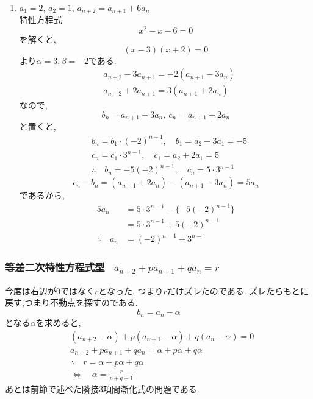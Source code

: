 \begin{enumerate}[label=(\arabic*),parsep=3pt]
\begin{align*}
          &\therefore \quad c_n=\frac12+(n-1)\cdot\frac12=\frac n2\\
          &\therefore \quad a_n=2^n\cdot c_n=n\cdot2^{n-1}
        \end{align*}
  \item $\displaystyle a_1=2,\,a_2=1,\, a_{n+2}=a_{n+1}+6a_n$\\
        特性方程式
        \[
          x^2-x-6=0
        \]
        を解くと,
        \[
          (x-3)(x+2)=0
        \]
        より$\alpha=3,\beta=-2$である.
        \begin{align*}
          &a_{n+2}-3a_{n+1}=-2(a_{n+1}-3a_n)\\
          &a_{n+2}+2a_{n+1}=3(a_{n+1}+2a_n)
        \end{align*}
        なので,
        \[
          b_n=a_{n+1}-3a_n,\ c_n=a_{n+1}+2a_n
        \]
        と置くと,
        \begin{align*}
          &b_n=b_1\cdot(-2)^{n-1},\quad b_1=a_2-3a_1=-5\\
          &c_n=c_1\cdot3^{n-1},\quad c_1=a_2+2a_1=5\\
          &\therefore \quad b_n=-5(-2)^{n-1},\quad c_n=5\cdot3^{n-1}
        \end{align*}
        \[
          c_n-b_n=(a_{n+1}+2a_n)-(a_{n+1}-3a_n)=5a_n
        \]
        であるから,
        \begin{align*}
          5a_n&=5\cdot3^{n-1}-\{-5(-2)^{n-1}\}\\
          &=5\cdot3^{n-1}+5(-2)^{n-1}\\
          \therefore\quad a_n&=(-2)^{n-1}+3^{n-1}
        \end{align*}
\end{enumerate}

\subsubsection{等差二次特性方程式型 \, $\displaystyle a_{n+2}+pa_{n+1}+qa_n=r$}
今度は右辺が0ではなく$r$となった.
つまり$r$だけズレたのである.
ズレたらもとに戻す,つまり不動点を探すのである.
\[
  b_n=a_n-\alpha
\]
となる$\alpha$を求めると,
\begin{align*}
   & (a_{n+2}-\alpha)+p(a_{n+1}-\alpha)+q(a_n-\alpha)=0 \\
   & a_{n+2}+pa_{n+1}+qa_n=\alpha+p\alpha+q\alpha       \\
   & \therefore \quad r=\alpha +p\alpha +q\alpha        \\
   & \Leftrightarrow \quad \alpha=\frac{r}{p+q+1}
\end{align*}
あとは前節で述べた隣接3項間漸化式の問題である.

